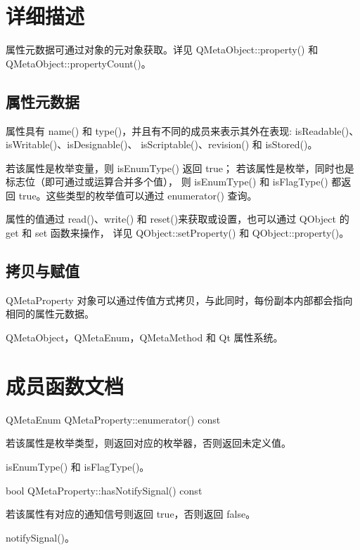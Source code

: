 \section{详细描述}

属性元数据可通过对象的元对象获取。详见 QMetaObject::property() 和 QMetaObject::propertyCount()。

\subsection{属性元数据}

属性具有 name() 和 type()，并且有不同的成员来表示其外在表现: isReadable()、isWritable()、isDesignable()、
isScriptable()、revision() 和 isStored()。

若该属性是枚举变量，则 isEnumType() 返回 true；
若该属性是枚举，同时也是标志位（即可通过或运算合并多个值），
则 isEnumType() 和 isFlagType() 都返回 true。这些类型的枚举值可以通过 enumerator() 查询。

属性的值通过 read()、write() 和 reset()来获取或设置，也可以通过 QObject 的 get 和 set 函数来操作，
详见 QObject::setProperty() 和 QObject::property()。

\subsection{拷贝与赋值}

QMetaProperty 对象可以通过传值方式拷贝，与此同时，每份副本内部都会指向相同的属性元数据。

\begin{seeAlso}
QMetaObject，QMetaEnum，QMetaMethod 和 Qt 属性系统。
\end{seeAlso}

\section{成员函数文档}

QMetaEnum QMetaProperty::enumerator() const

若该属性是枚举类型，则返回对应的枚举器，否则返回未定义值。

\begin{seeAlso}
isEnumType() 和 isFlagType()。
\end{seeAlso}

bool QMetaProperty::hasNotifySignal() const

若该属性有对应的通知信号则返回 true，否则返回 false。

\begin{seeAlso}
notifySignal()。
\end{seeAlso}


